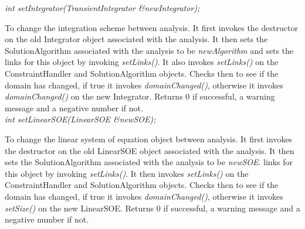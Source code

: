 {\em int setIntegrator(TransientIntegrator \&newIntegrator);}

To change the integration scheme between analysis. It first invokes the
destructor on the old Integrator object associated with the
analysis. It then sets the SolutionAlgorithm 
associated with the analysis to be {\em newAlgorithm} and sets the
links for this object by invoking {\em setLinks()}. It also invokes
{\em setLinks()} on the ConstraintHandler and SolutionAlgorithm
objects. Checks then to see if the domain has changed, if true it
invokes {\em domainChanged()}, otherwise it invokes {\em
domainChanged()} on the new Integrator. Returns $0$ if
successful, a warning message and a negative number if not.\\

{\em int setLinearSOE(LinearSOE \&newSOE);}

To change the linear system of equation object between analysis. It
first invokes the destructor on the old LinearSOE object associated
with the analysis. It then sets the SolutionAlgorithm 
associated with the analysis to be {\em newSOE}.
links for this object by invoking {\em setLinks()}. It then invokes
{\em setLinks()} on the ConstraintHandler and SolutionAlgorithm
objects. Checks then to see if the domain has changed, if true it
invokes {\em domainChanged()}, otherwise it invokes {\em
setSize()} on the new LinearSOE. Returns $0$ if successful, a warning
message and a negative number if not.\\ 
